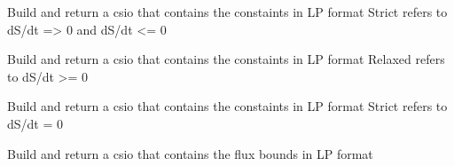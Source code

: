 \documentclass[a4paper,11pt,english]{sphinxmanual}
\begin{document}

\begin{fulllineitems}
\label{modules_doc:cbmpy.CBWrite.BuildLPConstraintsMath}
Build and return a csio that contains the constaints in LP format
Strict refers to dS/dt =\textgreater{} 0 and dS/dt \textless{}= 0

\end{fulllineitems}


\begin{fulllineitems}
\label{modules_doc:cbmpy.CBWrite.BuildLPConstraintsRelaxed}
Build and return a csio that contains the constaints in LP format
Relaxed refers to dS/dt \textgreater{}= 0

\end{fulllineitems}


\begin{fulllineitems}
\label{modules_doc:cbmpy.CBWrite.BuildLPConstraintsStrict}
Build and return a csio that contains the constaints in LP format
Strict refers to dS/dt = 0

\end{fulllineitems}


\begin{fulllineitems}
\label{modules_doc:cbmpy.CBWrite.BuildLPFluxBounds}
Build and return a csio that contains the flux bounds in LP format

\end{fulllineitems}

\end{document}
